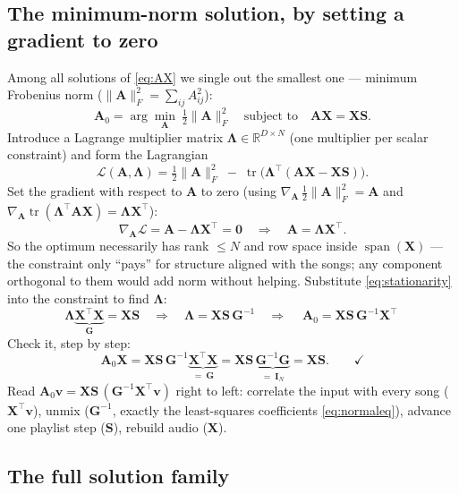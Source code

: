 \documentclass[11pt]{article}
\newcommand{\mA}{\bm{A}}
\newcommand{\mAo}{\bm{A}_0}
\newcommand{\mX}{\bm{X}}
\newcommand{\mS}{\bm{S}}
\newcommand{\mG}{\bm{G}}
\newcommand{\mI}{\bm{I}}
\newcommand{\mLam}{\bm{\Lambda}}
\newcommand{\vv}{\bm{v}}
\newcommand{\R}{\mathbb{R}}
\newcommand{\normF}[1]{\lVert #1 \rVert_F}
\newcommand{\tr}{\operatorname{tr}}
\newcommand{\spanof}{\operatorname{span}}
\begin{document}
\subsection{The minimum-norm solution, by setting a gradient to zero}

Among all solutions of \eqref{eq:AX} we single out the smallest one ---
minimum Frobenius norm ($\normF{\mA}^2 = \sum_{ij}A_{ij}^2$):
\begin{equation}
  \mAo = \arg\min_{\mA}\ \tfrac12\normF{\mA}^2
  \quad\text{subject to}\quad \mA\mX = \mX\mS .
\end{equation}
Introduce a Lagrange multiplier matrix $\mLam \in \R^{D\times N}$ (one
multiplier per scalar constraint) and form the Lagrangian
\begin{equation}
  \mathcal{L}(\mA,\mLam)
  = \tfrac12\normF{\mA}^2 \;-\; \tr\!\bigl(\mLam^\top(\mA\mX - \mX\mS)\bigr).
\end{equation}
Set the gradient with respect to $\mA$ to zero (using
$\nabla_{\mA}\,\tfrac12\normF{\mA}^2 = \mA$ and
$\nabla_{\mA}\tr(\mLam^\top\mA\mX) = \mLam\mX^\top$):
\begin{equation}
  \nabla_{\mA}\mathcal{L} = \mA - \mLam\mX^\top = \bm{0}
  \quad\Longrightarrow\quad
  \mA = \mLam\mX^\top .
  \label{eq:stationarity}
\end{equation}
So the optimum necessarily has rank $\le N$ and row space inside
$\spanof(\mX)$ --- the constraint only ``pays'' for structure aligned with
the songs; any component orthogonal to them would add norm without helping.
Substitute \eqref{eq:stationarity} into the constraint to find $\mLam$:
\begin{equation}
  \mLam\underbrace{\mX^\top\mX}_{\mG} = \mX\mS
  \quad\Longrightarrow\quad
  \mLam = \mX\mS\,\mG^{-1}
  \quad\Longrightarrow\quad
  \boxed{\ \mAo = \mX\mS\,\mG^{-1}\mX^\top\ }
  \label{eq:A0}
\end{equation}
Check it, step by step:
\begin{equation}
  \mAo\mX
  = \mX\mS\,\mG^{-1}\underbrace{\mX^\top\mX}_{=\ \mG}
  = \mX\mS\,\underbrace{\mG^{-1}\mG}_{=\ \mI_N}
  = \mX\mS. \qquad\checkmark
\end{equation}
Read $\mAo\vv = \mX\mS\,(\mG^{-1}\mX^\top\vv)$ right to left: correlate the
input with every song ($\mX^\top\vv$), unmix ($\mG^{-1}$, exactly the
least-squares coefficients \eqref{eq:normaleq}), advance one playlist step
($\mS$), rebuild audio ($\mX$).

\subsection{The full solution family}
\end{document}
